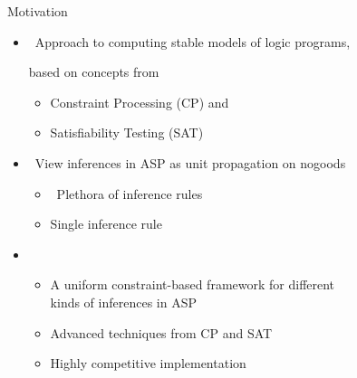 \begin{frame}{Motivation}
  \bigskip
  \begin{itemize}
  \item<1-> \ Approach to computing stable models of logic programs,

    based on concepts from
    \begin{itemize}\normalsize
    \item Constraint Processing (CP) and
    \item Satisfiability Testing (SAT)
    \end{itemize}
    \medskip
  \item<1-> \ View inferences in ASP as unit propagation on nogoods
    \begin{itemize}\normalsize
    \item <only@2-3>  \ Plethora of inference rules
    \item <only@2-3>  \quad  Single inference rule
    \end{itemize}
    \medskip
  \item<only@4-> 
    \begin{itemize}\normalsize
    \item A uniform constraint-based framework for different\\ kinds of inferences in ASP
    \item Advanced techniques from CP and SAT
    \item Highly competitive implementation
    \end{itemize}
  \end{itemize}
\end{frame}
%
